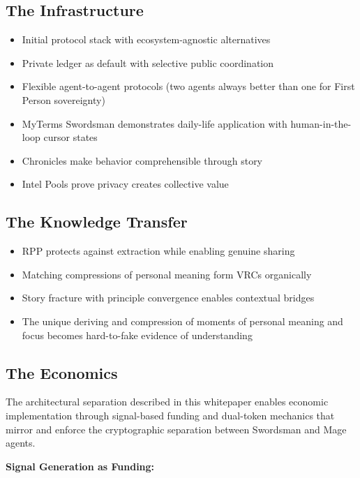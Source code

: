 \documentclass[
]{article}
\begin{document}
\subsection{The Infrastructure}\label{the-infrastructure}

\begin{itemize}
\item
  Initial protocol stack with ecosystem-agnostic alternatives
\item
  Private ledger as default with selective public coordination
\item
  Flexible agent-to-agent protocols (two agents always better than one
  for First Person sovereignty)
\item
  MyTerms Swordsman demonstrates daily-life application with
  human-in-the-loop cursor states
\item
  Chronicles make behavior comprehensible through story
\item
  Intel Pools prove privacy creates collective value
\end{itemize}

\subsection{The Knowledge Transfer}\label{the-knowledge-transfer}

\begin{itemize}
\item
  RPP protects against extraction while enabling genuine sharing
\item
  Matching compressions of personal meaning form VRCs organically
\item
  Story fracture with principle convergence enables contextual bridges
\item
  The unique deriving and compression of moments of personal meaning and
  focus becomes hard-to-fake evidence of understanding
\end{itemize}

\subsection{The Economics}\label{the-economics}

The architectural separation described in this whitepaper enables
economic implementation through signal-based funding and dual-token
mechanics that mirror and enforce the cryptographic separation between
Swordsman and Mage agents.

\textbf{Signal Generation as Funding:}
\end{document}
